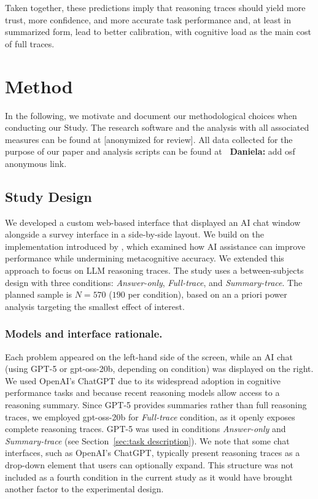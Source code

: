 \documentclass[acmlarge,review=true, anonymous=true]{acmart}
\newcommand{\daniela}[1]{\textcolor{colordaniela}{\textbf{\faComment~Daniela:} #1}}
\begin{document}
Taken together, these predictions imply that reasoning traces should yield more trust, more confidence, and more accurate task performance and, at least in summarized form, lead to better calibration, with cognitive load as the main cost of full traces.

\section{Method}

In the following, we motivate and document our methodological choices when conducting our Study. The research software and the analysis with all associated measures can be found at [anonymized for review]. All data collected for the purpose of our paper and analysis scripts can be found at \daniela{add osf anonymous link}.

\subsection{Study Design}
We developed a custom web-based interface that displayed an AI chat window alongside a survey interface in a side-by-side layout. We build on the implementation introduced by \citet{FERNANDES2026108779}, which examined how AI assistance can improve performance while undermining metacognitive accuracy. We extended this approach to focus on LLM reasoning traces. %
The study uses a between-subjects design with three conditions: \textit{Answer-only}, \textit{Full-trace}, and \textit{Summary-trace}. The planned sample is $N=570$ ($190$ per condition), based on an a priori power analysis targeting the smallest effect of interest.

\subsubsection{Models and interface rationale.}
Each problem appeared on the left-hand side of the screen, while an AI chat (using GPT-5 or gpt-oss-20b, depending on condition) was displayed on the right. %
We used OpenAI's ChatGPT due to its widespread adoption in cognitive performance tasks \cite{bastani2024generative,draxlerghost24,draxler2023gender} and because recent reasoning models allow access to a reasoning summary. Since GPT-5 provides summaries rather than full reasoning traces, we employed gpt-oss-20b for \textit{Full-trace} condition, as it openly exposes complete reasoning traces. GPT-5 was used in conditions \textit{Answer-only} and \textit{Summary-trace} (see Section~\ref{sec:task description}). We note that some chat interfaces, such as OpenAI's ChatGPT, typically present reasoning traces as a drop-down element that users can optionally expand. This structure was not included as a fourth condition in the current study as it would have brought another factor to the experimental design. %
\end{document}
